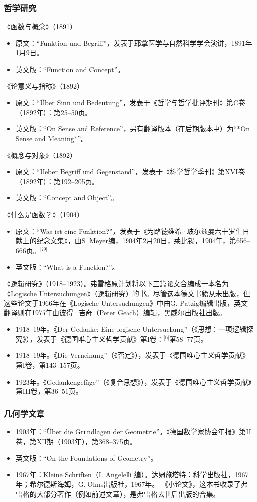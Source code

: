 \subsubsection{哲学研究}  
《函数与概念》（1891）
\begin{itemize}
\item 原文：“Funktion und Begriff”，发表于耶拿医学与自然科学学会演讲，1891年1月9日。  
\item 英文版：“Function and Concept”。
\end{itemize}
《论意义与指称》（1892）
\begin{itemize}
\item 原文：“Über Sinn und Bedeutung”，发表于《哲学与哲学批评期刊》第C卷（1892年）：第25–50页。  
\item 英文版：“On Sense and Reference”，另有翻译版本（在后期版本中）为“*On Sense and Meaning*”。
\end{itemize}
《概念与对象》（1892）
\begin{itemize}
\item 原文：“Ueber Begriff und Gegenstand”，发表于《科学哲学季刊》第XVI卷（1892年）：第192–205页。  
\item 英文版：“Concept and Object”。
\end{itemize}
《什么是函数？》（1904）
\begin{itemize}
\item 原文：“Was ist eine Funktion?”，发表于《为路德维希·玻尔兹曼六十岁生日献上的纪念文集》，由S. Meyer编，1904年2月20日，莱比锡，1904年，第656–666页。\(^\text{[29]}\)
\item 英文版：“What is a Function?”。
\end{itemize}
《逻辑研究》（1918–1923）。弗雷格原计划将以下三篇论文合编成一本名为《Logische Untersuchungen》（逻辑研究）的书。尽管这本德文书籍从未出版，但这些论文于1966年在《Logische Untersuchungen》中由G. Patzig编辑出版，英文翻译则在1975年由彼得·吉奇（Peter Geach）编辑，黑威尔出版社出版。
\begin{itemize}
\item 1918–19年。《Der Gedanke: Eine logische Untersuchung”（《思想：一项逻辑探究》），发表于《德国唯心主义哲学贡献》第I卷：\(^\text{[b]}\)第58–77页。  
\item 1918–19年。《Die Verneinung”（《否定》），发表于《德国唯心主义哲学贡献》第I卷，第143–157页。  
\item 1923年。《Gedankengefüge”（《复合思想》），发表于《德国唯心主义哲学贡献》第III卷，第36–51页。
\end{itemize}
\subsubsection{几何学文章}  
\begin{itemize}
\item 1903年：“Über die Grundlagen der Geometrie”。《德国数学家协会年报》第II卷，第XII期（1903年），第368–375页。  
\item 英文版：“On the Foundations of Geometry”。
\item 1967年：Kleine Schriften（I. Angelelli 编）。达姆施塔特：科学出版社，1967年；希尔德斯海姆，G. Olms出版社，1967年。  
《小论文》，这本书收录了弗雷格的大部分著作（例如前述文章），是弗雷格去世后出版的合集。
\end{itemize}
